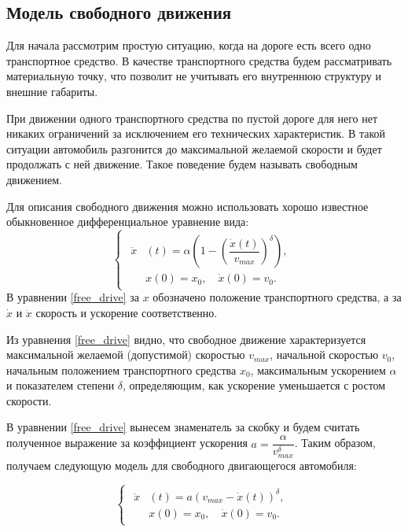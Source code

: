 \documentclass[12pt, a4paper]{extarticle}
\numberwithin{equation}{section}
\numberwithin{figure}{section}
\begin{document}
\subsection{Модель свободного движения}

Для начала рассмотрим простую ситуацию, когда на дороге есть всего одно транспортное средство. В качестве транспортного средства будем рассматривать материальную точку, что позволит не учитывать его внутреннюю структуру и внешние габариты. 

При движении одного транспортного средства по пустой дороге для него нет никаких ограничений за исключением его технических характеристик. В такой ситуации автомобиль разгонится до максимальной желаемой скорости и будет продолжать с ней движение. Такое поведение будем называть свободным движением. 

Для описания свободного движения можно использовать хорошо известное \cite{Shvetsov} обыкновенное дифференциальное уравнение вида: 
\begin{equation} \label{free_drive}
\begin{cases}
\begin{split}
\ddot{x}&(t) = \alpha\left( 1-\left( \dfrac{\dot{x}(t)}{v_{max}}\right)^\delta \right), \\
&x(0)=x_0, \quad \dot{x}(0)=v_{0}.
\end{split}
\end{cases}
\end{equation}
В уравнении \eqref{free_drive} за $x$ обозначено положение транспортного средства, а за $\dot{x}$ и $\ddot{x}$ скорость и ускорение соответственно.

Из уравнения \eqref{free_drive} видно, что свободное движение характеризуется максимальной желаемой (допустимой) скоростью $v_{max}$, начальной скоростью $v_{0}$, начальным положением транспортного средства $x_0$, максимальным ускорением $\alpha$ и показателем степени $\delta$, определяющим, как ускорение уменьшается с ростом скорости.

В уравнении \eqref{free_drive} вынесем знаменатель за скобку и будем считать полученное выражение за коэффициент ускорения $a=\dfrac{\alpha}{v_{max}^\delta}$. Таким образом, получаем следующую модель для свободного двигающегося автомобиля:

\begin{equation} \label{free_drive_with_initial_conditions}
\begin{cases}
\begin{split}
\ddot{x}&(t) = a\left( v_{max} - \dot{x}(t)\right)^\delta, \\
&x(0)=x_0, \quad \dot{x}(0)=v_0.
\end{split}
\end{cases}
\end{equation}
\end{document}
